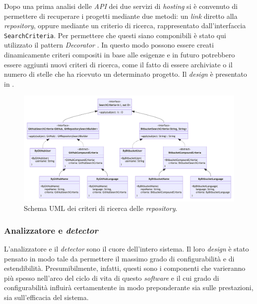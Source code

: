 Dopo una prima analisi delle \textit{API} dei due servizi di \textit{hosting} si è convenuto di permettere di recuperare i progetti mediante due metodi: un \textit{link} diretto alla \textit{repository}, oppure mediante un criterio di ricerca, rappresentato dall'interfaccia \texttt{SearchCriteria}.
%
Per permettere che questi siano componibili è stato qui utilizzato il pattern \textit{Decorator} \cite{gof}.
%
In questo modo possono essere creati dinamicamente criteri compositi in base alle esigenze e in futuro potrebbero essere aggiunti nuovi criteri di ricerca, come il fatto di essere archiviate o il numero di stelle che ha ricevuto un determinato progetto.
%
Il \textit{design} è presentato in .

\begin{figure}
    \centering
    \includegraphics[width=\textwidth]{resources/img/02-search-criteria.pdf}
    \caption{Schema UML dei criteri di ricerca delle \textit{repository}.}
    \label{img:02-search-criteria}
\end{figure}


\subsubsection*{Analizzatore e \textit{detector}}
L'analizzatore e il \textit{detector} sono il cuore dell'intero sistema.
%
Il loro \textit{design} è stato pensato in modo tale da permettere il massimo grado di configurabilità e di estendibilità.
%
Presumibilmente, infatti, questi sono i componenti che varieranno più spesso nell'arco del ciclo di vita di questo \textit{software} e il cui grado di configurabilità influirà certamentente in modo preponderante sia sulle prestazioni, sia sull'efficacia del sistema.

